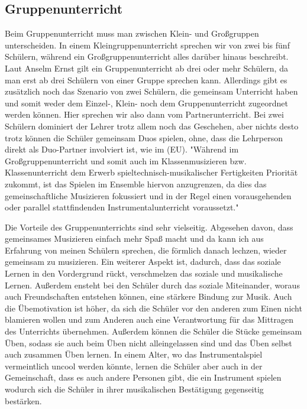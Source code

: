 \subsection{Gruppenunterricht} 
Beim Gruppenunterricht muss man zwischen Klein- und Großgruppen unterscheiden.
In einem Kleingruppenunterricht sprechen wir von zwei bis fünf Schülern, während
ein Großgruppenunterricht alles darüber hinaus beschreibt.
\autocite[219]{busch:grundwissen_instrumentalpaedagogik} Laut Anselm Ernst gilt ein Gruppenunterricht ab
drei oder mehr Schülern, da
man
erst ab drei Schülern von einer Gruppe sprechen kann.
\autocite[79]{ernst:die_zukunftsfaehige_musikschule}
Allerdings gibt es zusätzlich noch das Szenario von zwei Schülern, die gemeinsam
Unterricht haben und somit weder dem Einzel-, Klein- noch dem Gruppenunterricht
zugeordnet werden können. Hier sprechen wir also dann vom
Partnerunterricht.\autocite[219]{busch:grundwissen_instrumentalpaedagogik} Bei zwei Schülern dominiert der
Lehrer trotz allem
noch das Geschehen, aber nichts desto trotz können die Schüler gemeinsam Duos
spielen, ohne, dass die Lehrperson direkt als Duo-Partner involviert ist, wie im
(EU). "Während im Großgruppenunterricht und somit auch im Klassenmusizieren bzw.
Klassenunterricht dem Erwerb spieltechnisch-musikalischer Fertigkeiten Priorität
zukommt, ist das Spielen im Ensemble hiervon anzugrenzen, da dies das
gemeinschaftliche Musizieren fokussiert und in der Regel einen vorausgehenden
oder parallel stattfindenden Instrumentalunterricht voraussetzt."\autocite[219]{busch:grundwissen_instrumentalpaedagogik}

Die Vorteile des Gruppenunterrichts sind sehr vielseitig. Abgesehen davon, dass
gemeinsames Musizieren einfach mehr Spaß macht und da kann ich aus Erfahrung von
meinen Schülern sprechen, die förmlich danach lechzen, wieder gemeinsam zu
musizieren. Ein weiterer Aspekt ist, dadurch, dass das soziale
Lernen in den Vordergrund rückt, verschmelzen das soziale und musikalische
Lernen. Außerdem ensteht bei den Schüler durch das soziale Miteinander, woraus
auch Freundschaften entstehen können, eine stärkere Bindung zur Musik. Auch die Übemotivation ist höher, da sich die Schüler vor den anderen
zum Einen nicht blamieren wollen und zum Anderen auch eine Verantwortung für das
Mittragen des Unterrichts übernehmen. Außerdem können die Schüler die Stücke
gemeinsam Üben, sodass sie auch beim Üben nicht alleingelassen sind und das Üben
selbst auch zusammen Üben lernen. In einem Alter, wo das Instrumentalspiel
vermeintlich uncool werden könnte, lernen die Schüler aber auch in der
Gemeinschaft, dass es auch andere Personen gibt, die ein Instrument spielen
wodurch sich die Schüler in ihrer musikalischen Bestätigung gegenseitig
bestärken. \autocite{ernst:die_zukunftsfaehige_musikschule}

